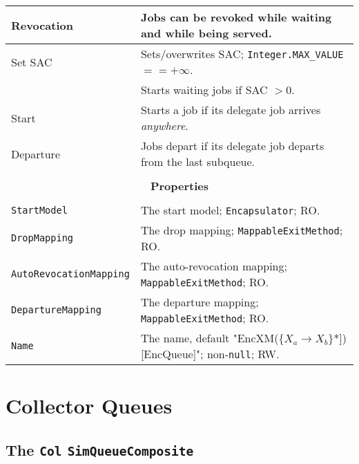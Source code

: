 \begin{tabular}{|l|l|}
	\hline
	Revocation & Jobs can be revoked while waiting and while being served. \\
	\hline
	Set SAC & Sets/overwrites SAC; \lstinline|Integer.MAX_VALUE| $== +\infty$. \\
	& Starts waiting jobs if SAC $> 0$. \\
	\hline
	Start & Starts a job if its delegate job arrives {\em anywhere}. \\
	\hline
	Departure & Jobs depart if its delegate job departs from the last subqueue. \\
	\hline
	\multicolumn{2}{|c|}{} \\
	\multicolumn{2}{|c|}{\bf Properties} \\
	\multicolumn{2}{|c|}{} \\
	\hline
	\lstinline|StartModel|    & The start model; \lstinline|Encapsulator|; RO. \\
	\hline
	\lstinline|DropMapping| & The drop mapping; \lstinline|MappableExitMethod|; RO. \\
	\hline
	\lstinline|AutoRevocationMapping| & The auto-revocation mapping; \lstinline|MappableExitMethod|; RO. \\
	\hline
	\lstinline|DepartureMapping| & The departure mapping; \lstinline|MappableExitMethod|; RO. \\
	\hline
	\lstinline|Name|          & The name, default "EncXM(\{$X_{a}\rightarrow X_{b}$\}*])[EncQueue]"; non-\lstinline|null|; RW. \\
	\hline
\end{tabular}

\section{Collector Queues}

\subsection{The \lstinline|Col| \lstinline{SimQueueComposite}}
\label{sec:Col}

